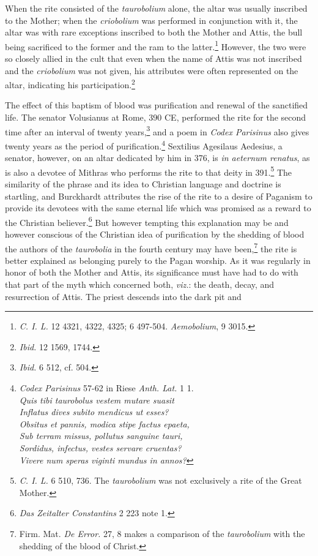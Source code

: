 \documentclass[a4paper, 11pt, oneside, polutonikogreek, french]{article}
\begin{document}
When the rite consisted of the \emph{taurobolium} alone, the altar was usually inscribed to the Mother; when the \emph{criobolium} was performed in conjunction with it, the altar was with rare exceptions inscribed to both the Mother and Attis, the bull being sacrificed to the former and the ram to the latter.\footnote{\emph{C. I. L.} 12 4321, 4322, 4325; 6 497-504. \emph{Aemobolium}, 9 3015.} However, the two were so closely allied in the cult that even when the name of Attis was not inscribed and the \emph{criobolium} was not given, his attributes were often represented on the altar, indicating his participation.\footnote{\emph{Ibid.} 12 1569, 1744.}

The effect of this baptism of blood was purification and renewal of the sanctified life. The senator Volusianus at Rome, 390 \textsc{CE}, performed the rite for the second time after an interval of twenty years,\footnote{\emph{Ibid.} 6 512, cf. 504.} and a poem in \emph{Codex Parisinus} also gives twenty years as the period of purification.\footnote{\emph{Codex Parisinus} 57-62 in Riese \emph{Anth. Lat.} 1 1.\\\hspace*{10mm}\emph{Quis tibi taurobolus vestem mutare suasit}\\\hspace*{10mm}\emph{Inflatus dives subito mendicus ut esses?}\\\hspace*{10mm}\emph{Obsitus et pannis, modica stipe factus epaeta,}\\\hspace*{10mm}\emph{Sub terram missus, pollutus sanguine tauri,}\\\hspace*{10mm}\emph{Sordidus, infectus, vestes servare cruentas?}\\\hspace*{10mm}\emph{Vivere num speras viginti mundus in annos?}} Sextilius Agesilaus Aedesius, a senator, however, on an altar dedicated by him in 376, is \emph{in aeternum renatus}, as is also a devotee of Mithras who performs the rite to that deity in 391.\footnote{\emph{C. I. L.} 6 510, 736. The \emph{taurobolium} was not exclusively a rite of the Great Mother.} The similarity of the phrase and its idea to Christian language and doctrine is startling, and Burckhardt attributes the rise of the rite to a desire of Paganism to provide its devotees with the same eternal life which was promised as a reward to the Christian believer.\footnote{\emph{Das Zeitalter Constantins} 2 223 note 1.} But however tempting this explanation may be and however conscious of the Christian idea of purification by the shedding of blood the authors of the \emph{taurobolia} in the fourth century may have been,\footnote{Firm. Mat. \emph{De Error.} 27, 8 makes a comparison of the \emph{taurobolium} with the shedding of the blood of Christ.} the rite is better explained as belonging purely to the Pagan worship. As it was regularly in honor of both the Mother and Attis, its significance must have had to do with that part of the myth which concerned both, \emph{viz.}: the death, decay, and resurrection of Attis. The priest descends into the dark pit and 
\end{document}
